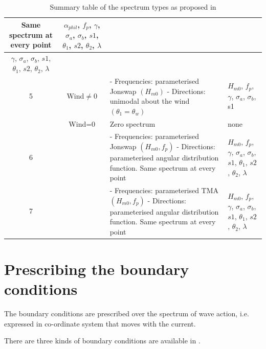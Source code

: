 \begin{table}
\begin{tabular}{|c|c|p{2.2in}|p{1.8in}|}
Same spectrum at every point& $\alpha_{phil}$, $ f_p$, $ \gamma $, $ \sigma_a$, $ \sigma_b$, $ s1$, $ \theta_1$, $ s2$, $ \theta_2$,
$ \lambda$ \\ \hline
$ \gamma $, $ \sigma_a$, $ \sigma_b$, $s1$, $ \theta_1$, $ s2$, $ \theta_2$, $ \lambda$ \\ \hline
5 & Wind$\ne 0$ & - Frequencies: parameterised Jonswap $(H_{m0})$ \newline - Directions: unimodal about the wind  $(\theta_1 = \theta_w)$
& $H_{m0}$, $ f_p$, $ \gamma $, $ \sigma_a$, $ \sigma_b$, s1 \\ \hline
 & Wind=0 & Zero spectrum & none \\ \hline
6 &  & - Frequencies: parameterised Jonswap  $(H_{m0}, f_p)$  \newline - Directions: parameterised angular distribution function.
Same spectrum at every point& $H_{m0}$, $ f_p$, $ \gamma $, $ \sigma_a$, $ \sigma_b$, $s1$, $ \theta_1$, $ s2$, $ \theta_2$, $ \lambda$ \\
\hline
7 &  & - Frequencies: parameterised TMA $(H_{m0}, f_p)$ \newline - Directions: parameterised angular distribution function. Same
spectrum at every point & $H_{m0}$, $ f_p$, $ \gamma $, $ \sigma_a$, $ \sigma_b$, $s1$, $ \theta_1$, $ s2$, $ \theta_2$, $ \lambda$ \\
\hline
\end{tabular}
\caption{\label{tab:Jonswap}Summary table of the spectrum types as proposed in \tomawac}
\end{table}



\section{  Prescribing the boundary conditions}

The boundary conditions are prescribed over the  spectrum of wave action, i.e. expressed in co-ordinate system
that moves with the current.

 There are three kinds of boundary conditions are available in \tomawac.

